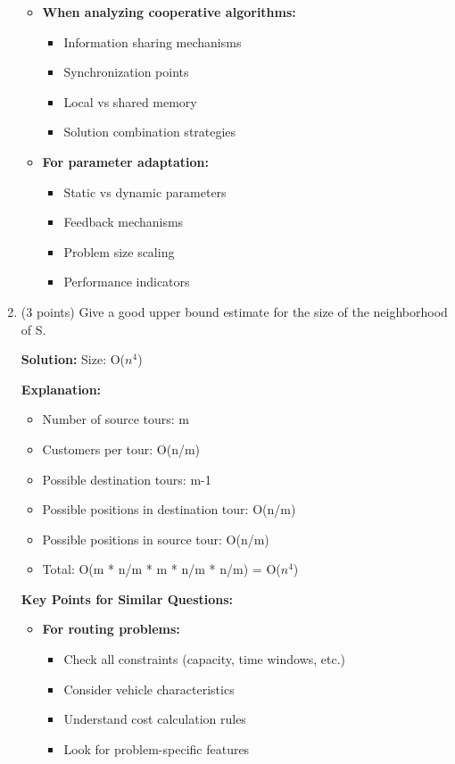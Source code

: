 \begin{enumerate}[label=\alph*)]
\begin{itemize}
\item \textbf{When analyzing cooperative algorithms:}
  \begin{itemize}
  \item Information sharing mechanisms
  \item Synchronization points
  \item Local vs shared memory
  \item Solution combination strategies
  \end{itemize}

\item \textbf{For parameter adaptation:}
  \begin{itemize}
  \item Static vs dynamic parameters
  \item Feedback mechanisms
  \item Problem size scaling
  \item Performance indicators
  \end{itemize}
\end{itemize}

\item (3 points) Give a good upper bound estimate for the size of the neighborhood of S.

\textbf{Solution:} Size: O($n^4$)

\textbf{Explanation:}
\begin{itemize}
\item Number of source tours: m
\item Customers per tour: O(n/m)
\item Possible destination tours: m-1
\item Possible positions in destination tour: O(n/m)
\item Possible positions in source tour: O(n/m)
\item Total: O(m * n/m * m * n/m * n/m) = O($n^4$)
\end{itemize}

\textbf{Key Points for Similar Questions:}
\begin{itemize}
\item \textbf{For routing problems:}
  \begin{itemize}
  \item Check all constraints (capacity, time windows, etc.)
  \item Consider vehicle characteristics
  \item Understand cost calculation rules
  \item Look for problem-specific features
  \end{itemize}


\end{itemize}
\end{enumerate}
